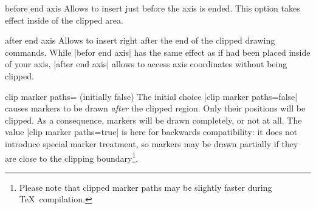 \begin{pgfplotscodekey}{before end axis}
Allows to insert  just before the axis is ended. This option takes effect inside of the clipped area.
\begin{codeexample}[]
\end{codeexample}
\end{pgfplotscodekey}

\begin{pgfplotscodekey}{after end axis}
Allows to insert  right after the end of the clipped drawing commands. While |befor end axis| has the same effect as if  had been placed inside of your axis, |after end axis| allows to access axis coordinates without being clipped.
\begin{codeexample}[]
\end{codeexample}
\end{pgfplotscodekey}

\begin{pgfplotskey}{clip marker paths= (initially false)}
	The initial choice |clip marker paths=false| causes markers to be drawn \emph{after} the clipped region. Only their positions will be clipped. As a consequence, markers will be drawn completely, or not at all. The value |clip marker paths=true| is here for backwards compatibility: it does not introduce special marker treatment, so markers may be drawn partially if they are close to the clipping boundary\footnote{Please note that clipped marker paths may be slightly faster during \TeX\ compilation.}.
\end{pgfplotskey}

